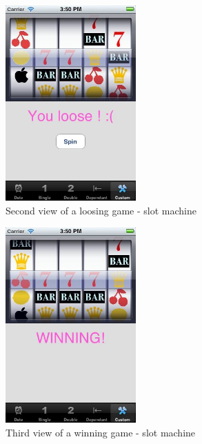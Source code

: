 \documentclass[a4paper, 12pt, final]{article}
\begin{document}
\begin{figure}[!h] %
\centering
\includegraphics[width=5cm]{6.jpg} %
\caption{Second view of a loosing game - slot machine } %
\label{api} %
\end{figure} %


\begin{figure}[!h] %
\centering
\includegraphics[width=5cm]{7.jpg} %
\caption{Third view of a winning game - slot machine} %
\label{api} %
\end{figure} %

 
\end{document}
